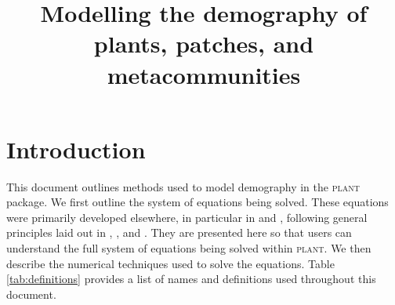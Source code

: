 \documentclass[10pt,twoside]{article}
\title{Modelling the demography of plants, patches, and metacommunities}
\date{}
\newcommand{\plant}{\textsc{plant}}
\begin{document}
\maketitle

\tableofcontents

\section{Introduction}

This document outlines methods used to model demography in the {\plant}
package. We first outline the system of equations being solved. These equations were primarily
developed elsewhere, in particular in \citet{Falster-2011} and
\citet{Falster-2015}, following general principles laid out in
\citet{Deroos-1997}, \citet{Kohyama-1993}, and \citet{Moorcroft-2001}. They are presented here so that
users can understand the full system of equations being solved within {\plant}.
We then describe the numerical techniques used to solve the equations.
Table \ref{tab:definitions} provides a list of names and definitions used
throughout this document.
\end{document}
